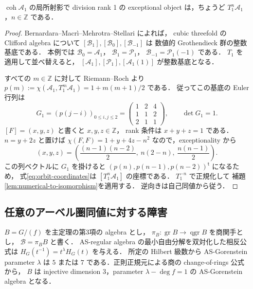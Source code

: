 \begin{proposition}
\label{prop:classification1}
$\operatorname{coh}\mathcal A_1$ の局所射影で division rank 1 の
exceptional object は，ちょうど $T_1^n\mathcal A_1$，$n\in\mathbb Z$ である．
\end{proposition}
\begin{proof}
Bernardara--Macr\`i--Mehrotra--Stellari
\cite[Propositions~2.9(ii) and 2.12]{BMMS2012} によれば，
cubic threefold の Clifford algebra について
$[\mathcal B_1],[\mathcal B_0],[\mathcal B_{-1}]$ は
数値的 Grothendieck 群の整数基底である．
本例では $\mathcal B_0=\mathcal A_1$，
$\mathcal B_1=\mathcal P_1$，
$\mathcal B_{-1}=\mathcal P_1(-1)$ である．
$T_1$ を適用して並べ替えると，
$[\mathcal A_1],[\mathcal P_1],[\mathcal A_1(1)]$ が整数基底となる．

すべての $m\in\mathbb Z$ に対して Riemann--Roch より
$p(m):=\chi(\mathcal A_1,T_1^m\mathcal A_1)=1+m(m+1)/2$ である．
従ってこの基底の Euler 行列は
\begin{equation}
 G_1=(p(j-i))_{0\le i,j\le2}
 =\begin{pmatrix}1&2&4\\1&1&2\\2&1&1\end{pmatrix},
 \qquad\det G_1=1.
 \label{eq:Euler1}
\end{equation}
$[F]=(x,y,z)$ と書くと $x,y,z\in\mathbb Z$，
rank 条件は $x+y+z=1$ である．
$n=y+2z$ と置けば
$\chi(F,F)=1+y+4z-n^2$ なので，exceptionality から
\begin{equation}
 (x,y,z)=
 \left(\frac{(n-1)(n-2)}2,\ n(2-n),\
 \frac{n(n-1)}2\right).
 \label{eq:orbit-coordinates}
\end{equation}
この列ベクトルに $G_1$ を掛けると
$(p(n),p(n-1),p(n-2))^{\mathsf t}$ になるため，
式\eqref{eq:orbit-coordinates}は $[T_1^n\mathcal A_1]$ の座標である．
$T_1^{-n}$ で正規化して
補題\ref{lem:numerical-to-isomorphism}を適用する．
逆向きは自己同値から従う．
\end{proof}

\subsection{任意のアーベル圏同値に対する障害}

$B=G/(f)$ を主定理の第3項の algebra とし，
$\pi_B:\operatorname{gr}B\to\operatorname{qgr}B$ を商関手とし，
$\mathcal B=\pi_B B$ と書く．
AS-regular algebra の最小自由分解を双対化した相反公式は
$H_G(t^{-1})=t^\lambda H_G(t)$ を与える．
所定の Hilbert 級数から AS-Gorenstein parameter $\lambda$ は
$5$ または $7$ である．正則正規元による商の change-of-rings 公式から，
$B$ は injective dimension $3$，parameter $\lambda-\deg f=1$ の
AS-Gorenstein algebra となる．

